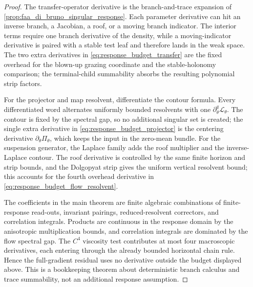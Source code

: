 \documentclass[12pt, letterpaper]{amsart}
\providecommand{\Ltransfer}{\mathscr{L}}
\theoremstyle{plain}
\theoremstyle{definition}
\theoremstyle{remark}
\begin{document}
\begin{proof}
The transfer-operator derivative is the branch-and-trace expansion of
\cref{prop:faa_di_bruno_singular_response}.  Each parameter derivative can hit an
inverse branch, a Jacobian, a roof, or a moving branch indicator.  The interior
terms require one branch derivative of the density, while a moving-indicator
derivative is paired with a stable test leaf and therefore lands in the weak
space.  The two extra derivatives in
\eqref{eq:response_budget_transfer} are the fixed overhead for the blown-up
grazing coordinate and the stable-holonomy comparison; the terminal-child
summability absorbs the resulting polynomial strip factors.

For the projector and map resolvent, differentiate the contour formula.  Every
differentiated word alternates uniformly bounded resolvents with one
\(\partial_\theta^q\Ltransfer_\theta\).  The contour is fixed by the spectral gap,
so no additional singular set is created; the single extra derivative in
\eqref{eq:response_budget_projector} is the centering derivative
\(\partial_\theta\Pi_\theta\), which keeps the input in the zero-mean bundle.  For
the suspension generator, the Laplace family adds the roof multiplier and the
inverse-Laplace contour.  The roof derivative is controlled by the same finite
horizon and strip bounds, and the Dolgopyat strip gives the uniform vertical
resolvent bound; this accounts for the fourth overhead derivative in
\eqref{eq:response_budget_flow_resolvent}.

The coefficients in the main theorem are finite algebraic combinations of
finite-response read-outs, invariant pairings, reduced-resolvent correctors, and
correlation integrals.  Products are continuous in the response domain by the
anisotropic multiplication bounds, and correlation integrals are dominated by the
flow spectral gap.  The \(C^4\) viscosity test contributes at most four
macroscopic derivatives, each entering through the already bounded horizontal
chain rule.  Hence the full-gradient residual uses no derivative outside the
budget displayed above.  This is a bookkeeping theorem about deterministic
branch calculus and trace summability, not an additional response assumption.
\end{proof}
\end{document}
